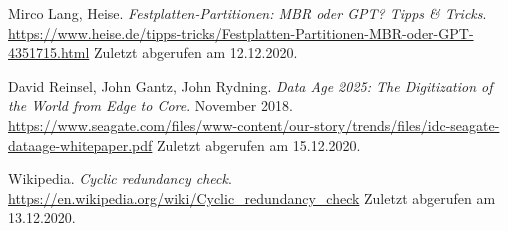 \begin{thebibliography}{99}
        Mirco Lang, Heise.
        \textit{Festplatten-Partitionen: MBR oder GPT? Tipps \& Tricks}.
        \url{https://www.heise.de/tipps-tricks/Festplatten-Partitionen-MBR-oder-GPT-4351715.html}
        Zuletzt abgerufen am 12.12.2020.

        David Reinsel, John Gantz, John Rydning.
        \textit{Data Age 2025: The Digitization of the World from Edge to Core}.
        November 2018.
        \url{https://www.seagate.com/files/www-content/our-story/trends/files/idc-seagate-dataage-whitepaper.pdf}
        Zuletzt abgerufen am 15.12.2020.

        Wikipedia.
        \textit{Cyclic redundancy check}.
        \url{https://en.wikipedia.org/wiki/Cyclic_redundancy_check}
        Zuletzt abgerufen am 13.12.2020.
\end{thebibliography}
